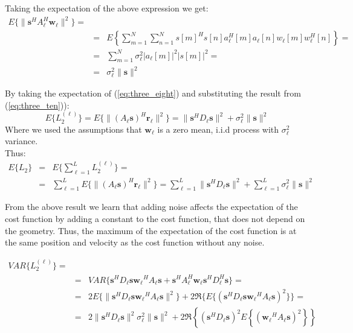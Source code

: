 Taking the expectation of the above expression we get:
\begin{eqnarray}
\label{eq:three_ten}
E\{\|\mathbf{s}^H A_\ell^H \mathbf{w_\ell}\|^2\}= \\
&=& E\left\{\sum_{m=1}^N\sum_{n=1}^N s[m]^H s[n] a_\ell^H[m] a_\ell[n] w_\ell[m] w_\ell^H[n]\right\}= \nonumber \\
&=& \sum_{m=1}^N \sigma_\ell^2 |a_\ell[m]|^2 |s[m]|^2 = \nonumber \\
&=& \sigma_\ell^2 \|\mathbf{s}\|^2 \nonumber
\end{eqnarray}

By taking the expectation of (\ref{eq:three_eight}) and substituting the result from (\ref{eq:three_ten})):
\begin{equation}
E\{L_2^{(\ell)}\}=E\{\|(A_\ell\mathbf{s})^H\mathbf{r_\ell}\|^2\}= \|\mathbf{s}^H D_\ell \mathbf{s}\|^2 + \sigma_\ell^2\|\mathbf{s}\|^2
\end{equation}
Where we used the assumptions that $\mathbf{w_\ell}$ is a zero mean, i.i.d process with $\sigma_\ell^2$ variance.\\

Thus:
\begin{eqnarray}
E\{L_2\} &=& E\{\sum_{\ell=1}^L L_2^{(\ell)}\} = \\
&=&\sum_{\ell=1}^L E\{\|(A_\ell\mathbf{s})^H\mathbf{r_\ell}\|^2\}= \sum_{\ell=1}^L \|\mathbf{s}^H D_\ell \mathbf{s}\|^2 + \sum_{\ell=1}^L \sigma_\ell^2\|\mathbf{s}\|^2 \nonumber
\end{eqnarray}

From the above result we learn that adding noise affects the expectation of the cost function by adding a constant to the cost function, that does not depend on the geometry. Thus, the maximum of the expectation of the cost function is at the same position and velocity as the cost function without any noise.

\begin{eqnarray}
\label{eq:var_l_2_l_simplified}
VAR\{L_2^{(\ell)}\} = \\
&=&VAR\{ \mathbf{s}^H D_\ell \mathbf{s}\mathbf{w_\ell}^H A_\ell \mathbf{s} + \mathbf{s}^H A_\ell^H \mathbf{w_\ell}\mathbf{s}^H D_\ell^H \mathbf{s}\} = \nonumber\\
&=&2E\{\| \mathbf{s}^H D_\ell \mathbf{s}\mathbf{w_\ell}^H A_\ell \mathbf{s} \|^2 \} + 2\Re \{E\{(\mathbf{s}^H D_\ell \mathbf{s}\mathbf{w_\ell}^H A_\ell \mathbf{s})^2 \}\} =  \nonumber \\
&=&2\| \mathbf{s}^H D_\ell \mathbf{s}\|^2\sigma_\ell^2\|\mathbf{s}\|^2 +2 \Re \left\{(\mathbf{s}^H D_\ell \mathbf{s})^2 E\left\{(\mathbf{w_\ell}^H A_\ell \mathbf{s})^2\right\}\right\} \nonumber
\end{eqnarray}

